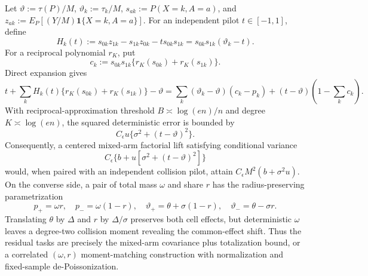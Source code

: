Let \(\vartheta:=\tau(P)/M\), \(\vartheta_k:=\tau_k/M\), \(s_{ak}:=P(X=k,A=a)\), and \(z_{ak}:=E_P[(Y/M)\mathbf 1\{X=k,A=a\}]\).  For an independent pilot \(t\in[-1,1]\), define
\[
 H_k(t):=s_{0k}z_{1k}-s_{1k}z_{0k}-t s_{0k}s_{1k}
 =s_{0k}s_{1k}(\vartheta_k-t).
\]
For a reciprocal polynomial \(r_K\), put
\[
 c_k:=s_{0k}s_{1k}\{r_K(s_{0k})+r_K(s_{1k})\}.
\]
Direct expansion gives
\[
 t+\sum_kH_k(t)\{r_K(s_{0k})+r_K(s_{1k})\}-\vartheta
 =\sum_k(\vartheta_k-\vartheta)(c_k-p_k)
 +(t-\vartheta)\left(1-\sum_kc_k\right).
\]
With reciprocal-approximation threshold \(B\asymp\log(en)/n\) and degree \(K\asymp\log(en)\), the squared deterministic error is bounded by
\[
 C_{\epsilon}u\{\sigma^2+(t-\vartheta)^2\}.
\]
Consequently, a centered mixed-arm factorial lift satisfying conditional variance
\[
 C_{\epsilon}\{b+u[\sigma^2+(t-\vartheta)^2]\}
\]
would, when paired with an independent collision pilot, attain \(C_{\epsilon}M^2(b+\sigma^2u)\).  On the converse side, a pair of total mass \(\omega\) and share \(r\) has the radius-preserving parametrization
\[
 p_+=\omega r,\quad p_-=\omega(1-r),\quad
 \vartheta_+=\theta+\sigma(1-r),\quad
 \vartheta_-=\theta-\sigma r.
\]
Translating \(\theta\) by \(\Delta\) and \(r\) by \(\Delta/\sigma\) preserves both cell effects, but deterministic \(\omega\) leaves a degree-two collision moment revealing the common-effect shift.  Thus the residual tasks are precisely the mixed-arm covariance plus totalization bound, or a correlated \((\omega,r)\) moment-matching construction with normalization and fixed-sample de-Poissonization.